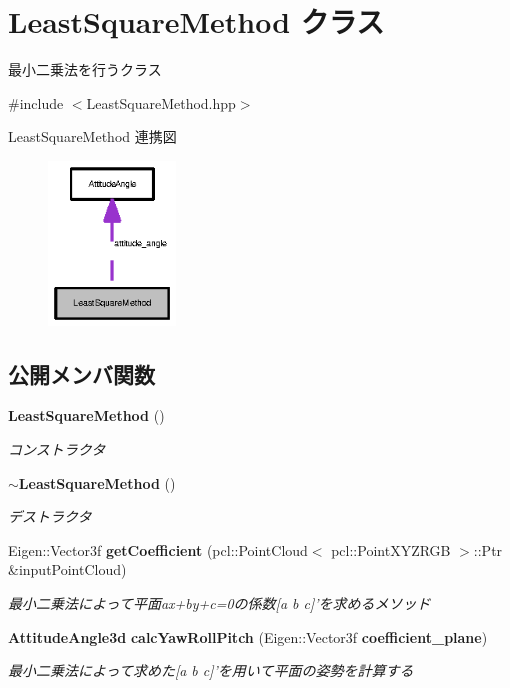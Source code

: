 \section{Least\-Square\-Method クラス}
\label{class_least_square_method}


最小二乗法を行うクラス  




{\ttfamily \#include $<$Least\-Square\-Method.\-hpp$>$}



Least\-Square\-Method 連携図\nopagebreak
\begin{figure}[H]
\begin{center}
\leavevmode
\includegraphics[width=96pt]{class_least_square_method__coll__graph}
\end{center}
\end{figure}
\subsection*{公開メンバ関数}
\begin{DoxyCompactItemize}
\item 
{\bf Least\-Square\-Method} ()
\begin{DoxyCompactList}\small\item\em コンストラクタ \end{DoxyCompactList}\item 
{\bf $\sim$\-Least\-Square\-Method} ()
\begin{DoxyCompactList}\small\item\em デストラクタ \end{DoxyCompactList}\item 
Eigen\-::\-Vector3f {\bf get\-Coefficient} (pcl\-::\-Point\-Cloud$<$ pcl\-::\-Point\-X\-Y\-Z\-R\-G\-B $>$\-::Ptr \&input\-Point\-Cloud)
\begin{DoxyCompactList}\small\item\em 最小二乗法によって平面ax+by+c=0の係数[a b c]'を求めるメソッド \end{DoxyCompactList}\item 
{\bf Attitude\-Angle3d} {\bf calc\-Yaw\-Roll\-Pitch} (Eigen\-::\-Vector3f {\bf coefficient\-\_\-plane})
\begin{DoxyCompactList}\small\item\em 最小二乗法によって求めた[a b c]'を用いて平面の姿勢を計算する \end{DoxyCompactList}\end{DoxyCompactItemize}
